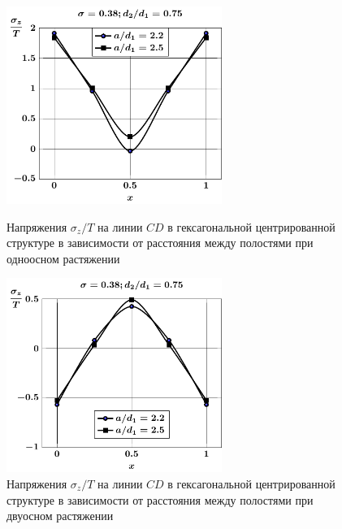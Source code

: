 \begin{figure}[h!]
\centering\footnotesize
\parbox[b]{7cm}{\centering\includegraphics[width=7cm]{cav13-a-d75-t1-sig_z-cd.pdf}
\caption{Напряжения $\sigma_z/T$ на линии $CD$ в гексагональной центрированной структуре в зависимости от расстояния между полостями при одноосном растяжении 
\label{f:9:54}}}\hfil\hfil
\parbox[b]{7cm}{\centering\includegraphics[width=7cm]{cav13-a-d75-t2-sig_z-cd.pdf}
\caption{Напряжения $\sigma_z/T$ на линии $CD$ в гексагональной центрированной структуре в зависимости от расстояния между полостями при двуосном растяжении
\label{f:9:55}}}
\end{figure}

